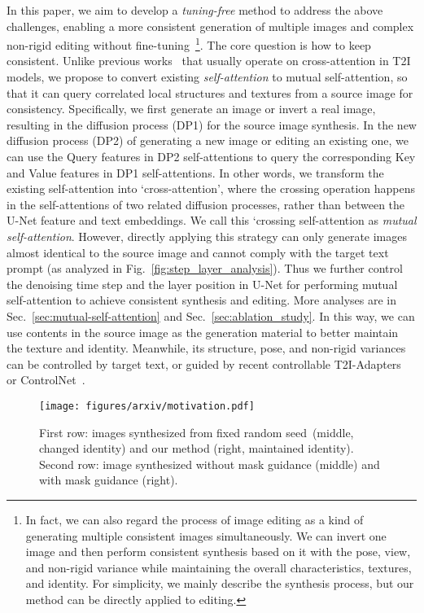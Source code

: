 \documentclass[10pt,twocolumn,letterpaper]{article}
\begin{document}
In this paper, we aim to develop a \textit{tuning-free} method to address the above challenges, enabling a more consistent generation of multiple images and complex non-rigid editing without fine-tuning~\footnote{In fact, we can also regard the process of image editing as a kind of generating multiple consistent images simultaneously. We can invert one image and then perform consistent synthesis based on it with the pose, view, and non-rigid variance while maintaining the overall characteristics, textures, and identity. For simplicity, we mainly describe the synthesis process, but our method can be directly applied to editing.}.
The core question is how to keep consistent. Unlike previous works~\cite{hertz2022prompt, parmar2023zero, chefer2023attend} that usually operate on cross-attention in T2I models, we propose to convert existing \textit{self-attention} to mutual self-attention, so that it can query correlated local structures and textures from a source image for consistency.
Specifically, we first generate an image or invert a real image, resulting in the diffusion process (DP1) for the source image synthesis. 
In the new diffusion process (DP2) of generating a new image or editing an existing one, we can use the Query features in DP2 self-attentions to query the corresponding Key and Value features in DP1 self-attentions. 
In other words, we transform the existing self-attention into `cross-attention', where the crossing operation happens in the self-attentions of two related diffusion processes, rather than between the U-Net feature and text embeddings. We call this `crossing self-attention as \textit{mutual self-attention}. 
However, directly applying this strategy can only generate images almost identical to the source image and cannot comply with the target text prompt (as analyzed in Fig.~\ref{fig:step_layer_analysis}). Thus we further control the denoising time step and the layer position in U-Net for performing mutual self-attention to achieve consistent synthesis and editing. More analyses are in Sec.~\ref{sec:mutual-self-attention} and Sec.~\ref{sec:ablation_study}.
In this way, we can use contents in the source image as the generation material to better maintain the texture and identity. Meanwhile, its structure, pose, and non-rigid variances can be controlled by target text, or guided by recent controllable T2I-Adapters~\cite{mou2023t2i} or ControlNet~\cite{zhang2023adding}.
\begin{figure}[!t]
    \centering
    \texttt{[image: figures/arxiv/motivation.pdf]}
    \caption{First row: images synthesized from fixed random seed~(middle, changed identity) and our method (right, maintained identity). Second row: image synthesized without mask guidance (middle) and with mask guidance (right).}
    \label{fig:motivation}
\end{figure}
\end{document}
